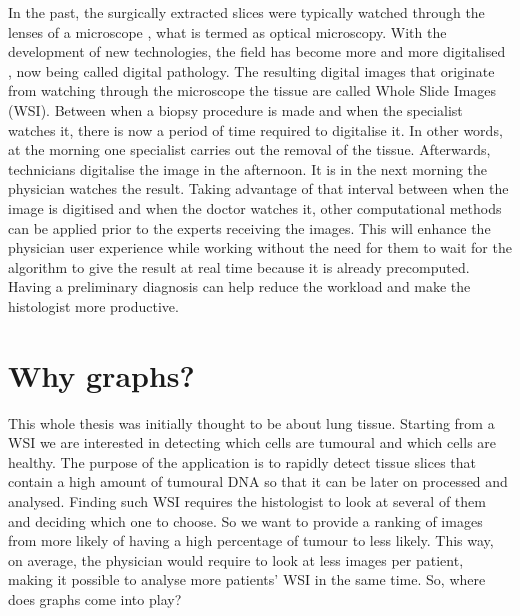 In the past, the surgically extracted slices were typically watched through the lenses of a microscope \cite{Chen2011}, what is termed as optical microscopy. With the development of new technologies, the field has become more and more digitalised \cite{Kumar2020}, now being called digital pathology. The resulting digital images that originate from watching through the microscope the tissue are called Whole Slide Images (WSI). Between when a biopsy procedure is made and when the specialist watches it, there is now a period of time required to digitalise it. In other words, at the morning one specialist carries out the removal of the tissue. Afterwards, technicians digitalise the image in the afternoon. It is in the next morning the physician watches the result. Taking advantage of that interval between when the image is digitised and when the doctor watches it, other computational methods can be applied prior to the experts receiving the images. This will enhance the physician user experience while working without the need for them to wait for the algorithm to give the result at real time because it is already precomputed. Having a preliminary diagnosis can help reduce the workload and make the histologist more productive.

\section{Why graphs?}

This whole thesis was initially thought to be about lung tissue. Starting from a WSI we are interested in detecting which cells are tumoural and which cells are healthy. The purpose of the application is to rapidly detect tissue slices that contain a high amount of tumoural DNA so that it can be later on processed and analysed. Finding such WSI requires the histologist to look at several of them and deciding which one to choose. So we want to provide a ranking of images from more likely of having a high percentage of tumour to less likely. This way, on average, the physician would require to look at less images per patient, making it possible to analyse more patients' WSI in the same time. So, where does graphs come into play?

